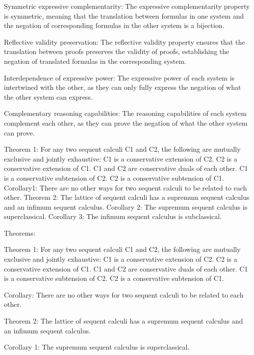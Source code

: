 Symmetric expressive complementarity: The expressive complementarity property is symmetric, meaning that the translation between formulas in one system and the negation of corresponding formulas in the other system is a bijection.

Reflective validity preservation: The reflective validity property ensures that the translation between proofs preserves the validity of proofs, establishing the negation of translated formulas in the corresponding system.

Interdependence of expressive power: The expressive power of each system is intertwined with the other, as they can only fully express the negation of what the other system can express.

Complementary reasoning capabilities: The reasoning capabilities of each system complement each other, as they can prove the negation of what the other system can prove.


Theorem 1: For any two sequent calculi C1 and C2, the following are mutually exclusive and jointly exhaustive:
C1 is a conservative extension of C2.
C2 is a conservative extension of C1.
C1 and C2 are conservative duals of each other.
C1 is a conservative subtension of C2.
C2 is a conservative subtension of C1.
Corollary1: There are no other ways for two sequent calculi to be related to each other.
Theorem 2: The lattice of sequent calculi has a supremum sequent calculus and an infimum sequent calculus.
Corollary 2: The supremum sequent calculus is superclassical.
Corollary 3: The infimum sequent calculus is subclassical.

Theorems:

Theorem 1: For any two sequent calculi C1 and C2, the following are mutually exclusive and jointly exhaustive:
C1 is a conservative extension of C2.
C2 is a conservative extension of C1.
C1 and C2 are conservative duals of each other.
C1 is a conservative subtension of C2.
C2 is a conservative subtension of C1.

Corollary: There are no other ways for two sequent calculi to be related to each other.

Theorem 2: The lattice of sequent calculi has a supremum sequent calculus and an infimum sequent calculus.

Corollary 1: The supremum sequent calculus is superclassical.


